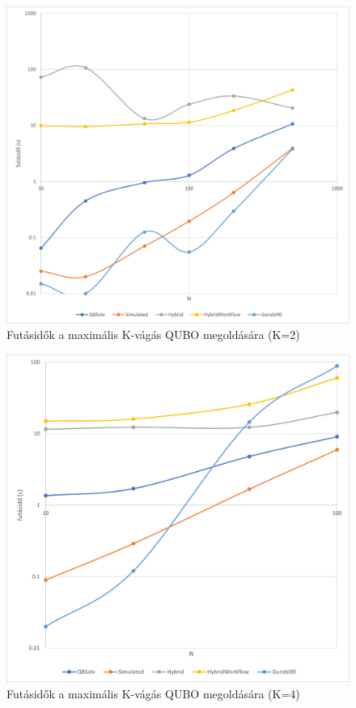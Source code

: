 \begin{figure}[!ht]
	\centering
	\includegraphics[width=150mm, keepaspectratio]{figures/diagrams/maxKCutQUBO_K2.png}
	\caption{Futásidők a maximális K-vágás QUBO megoldására (K=2)}
	\label{fig:maxKCutQUBO_K2}
\end{figure}

\begin{figure}[!ht]
	\centering
	\includegraphics[width=150mm, keepaspectratio]{figures/diagrams/maxKCutQUBO_K4.png}
	\caption{Futásidők a maximális K-vágás QUBO megoldására (K=4)}
	\label{fig:maxKCutQUBO_K4}
\end{figure}

